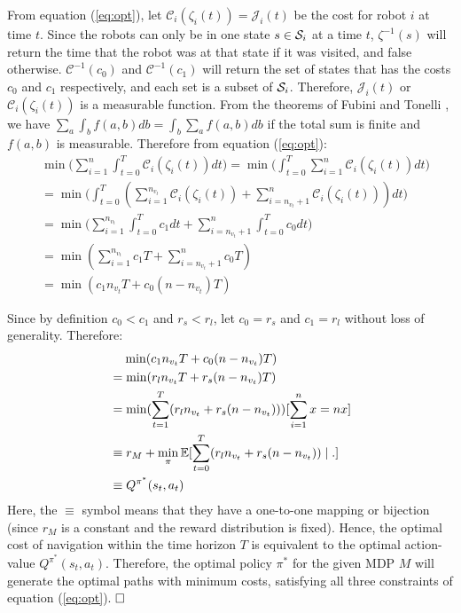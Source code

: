 \documentclass{article}
\begin{document}
From equation (\ref{eq:opt}), let $\mathcal{C}_i(\zeta_i(t)) = \mathcal{J}_i(t)$ be the cost for robot $i$ at time $t$. Since the robots can only be in one state $s \in \mathcal{S}_i$ at a time $t$, $\zeta^{-1}(s)$ will return the time that the robot was at that state if it was visited, and false otherwise. $\mathcal{C}^{-1}(c_0)$ and $\mathcal{C}^{-1}(c_1)$ will return the set of states that has the costs $c_0$ and $c_1$ respectively, and each set is a subset of $\mathcal{S}_i$. Therefore, $\mathcal{J}_i(t)$ or $\mathcal{C}_i(\zeta_i(t))$ is a measurable function. From the theorems of Fubini and Tonelli \cite{Royden2010RealAnalysis}, we have $\sum_a \int_b f(a,b)db = \int_b \sum_a f(a,b)db $ if the total sum is finite and $f(a,b)$ is measurable. Therefore from equation (\ref{eq:opt}):
\begin{align}
& \min \bigg( \sum_{i=1}^{n} \int_{t=0}^{T} \mathcal{C}_i (\zeta_i(t))dt \bigg) \nonumber = \min \bigg( \int_{t=0}^{T}  \sum_{i=1}^{n} \mathcal{C}_i (\zeta_i(t))dt \bigg) \nonumber \\
&=  \min \bigg( \int_{t=0}^{T} (\sum_{i=1}^{n_{v_t}} \mathcal{C}_i (\zeta_i(t)) + \sum_{i=n_{v_t}+1}^{n} \mathcal{C}_i (\zeta_i(t))) dt \bigg) \nonumber \\
&=  \min \bigg( \sum_{i=1}^{n_{v_t}} \int_{t=0}^{T} c_1dt + \sum_{i=n_{v_t}+1}^{n} \int_{t=0}^{T} c_0dt \bigg) \nonumber \\
&=  \min (\sum_{i=1}^{n_{v_t}} c_1 T+ \sum_{i=n_{v_t}+1}^{n} c_0 T) \nonumber \\
&=  \min (c_1n_{v_t}T + c_0(n-n_{v_t})T) 
\end{align}

Since by definition $c_0 < c_1$ and $r_s < r_l$, let $ c_0 = r_s$ and $c_1 = r_l$ without loss of generality. Therefore:
\begin{align}
&\phantom{=\ } \min (c_1n_{v_t}T + c_0(n-n_{v_t})T) \nonumber \\
&= \min (r_ln_{v_t} T+ r_s(n-n_{v_t}) T) \nonumber \\
&= \min (\sum_{t=1}^T(r_ln_{v_t} + r_s(n-n_{v_t}))) & \mathllap{[\sum_{i=1}^n x = nx]} \nonumber \\
&\equiv  r_M + \min_{\pi} \mathbb{E} [  \sum_{t=0}^T(r_l n_{v_t} +  r_s (n - n_{v_t})) \mid . ] \nonumber \\
&\equiv Q^{\pi^*}(s_t,a_t) 
\end{align}
Here, the $\equiv$ symbol means that they have a one-to-one mapping or bijection (since $r_M$ is a constant and the reward distribution is fixed). Hence, the optimal cost of navigation within the time horizon $T$ is equivalent to the optimal action-value $Q^{\pi^*}(s_t,a_t)$. Therefore, the optimal policy $\pi^*$ for the given MDP $M$ will generate the optimal paths with minimum costs, satisfying all three constraints of equation (\ref{eq:opt}). $\qed$
\end{document}
